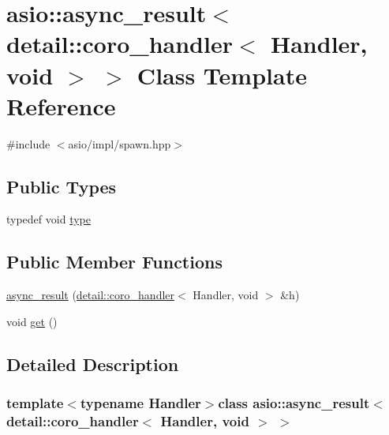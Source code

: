 \hypertarget{classasio_1_1async__result_3_01detail_1_1coro__handler_3_01_handler_00_01void_01_4_01_4}{}\section{asio\+:\+:async\+\_\+result$<$ detail\+:\+:coro\+\_\+handler$<$ Handler, void $>$ $>$ Class Template Reference}
\label{classasio_1_1async__result_3_01detail_1_1coro__handler_3_01_handler_00_01void_01_4_01_4}


{\ttfamily \#include $<$asio/impl/spawn.\+hpp$>$}

\subsection*{Public Types}
\begin{DoxyCompactItemize}
\item 
typedef void \hyperlink{classasio_1_1async__result_3_01detail_1_1coro__handler_3_01_handler_00_01void_01_4_01_4_a00ee10c54a413e044b8a4c70080e3c8e}{type}
\end{DoxyCompactItemize}
\subsection*{Public Member Functions}
\begin{DoxyCompactItemize}
\item 
\hyperlink{classasio_1_1async__result_3_01detail_1_1coro__handler_3_01_handler_00_01void_01_4_01_4_aa12f674a018987f457e013456c627aeb}{async\+\_\+result} (\hyperlink{classasio_1_1detail_1_1coro__handler}{detail\+::coro\+\_\+handler}$<$ Handler, void $>$ \&h)
\item 
void \hyperlink{classasio_1_1async__result_3_01detail_1_1coro__handler_3_01_handler_00_01void_01_4_01_4_a8cd734b679a190c83e755f0fb80d185a}{get} ()
\end{DoxyCompactItemize}


\subsection{Detailed Description}
\subsubsection*{template$<$typename Handler$>$class asio\+::async\+\_\+result$<$ detail\+::coro\+\_\+handler$<$ Handler, void $>$ $>$}



